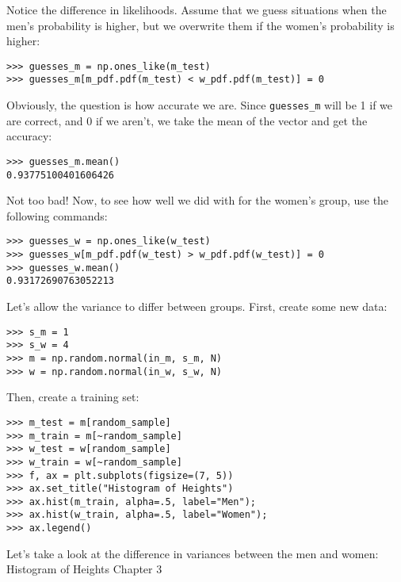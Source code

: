 \documentclass[SKL-MASTER.tex]{subfiles}
\begin{document}
Notice the difference in likelihoods.
Assume that we guess situations when the men's probability is higher, but we overwrite them
if the women's probability is higher:
\begin{framed}
	\begin{verbatim}
>>> guesses_m = np.ones_like(m_test)
>>> guesses_m[m_pdf.pdf(m_test) < w_pdf.pdf(m_test)] = 0
\end{verbatim}
\end{framed}
Obviously, the question is how accurate we are. Since \texttt{guesses\_m} will be 1 if we are correct,
and 0 if we aren't, we take the mean of the vector and get the accuracy:
\begin{framed}
	\begin{verbatim}
>>> guesses_m.mean()
0.93775100401606426
\end{verbatim}
\end{framed}
Not too bad! Now, to see how well we did with for the women's group, use the
following commands:
\begin{framed}
	\begin{verbatim}
>>> guesses_w = np.ones_like(w_test)
>>> guesses_w[m_pdf.pdf(w_test) > w_pdf.pdf(w_test)] = 0
>>> guesses_w.mean()
0.93172690763052213
\end{verbatim}
\end{framed}
Let's allow the variance to differ between groups. First, create some new data:
\begin{framed}
	\begin{verbatim}
>>> s_m = 1
>>> s_w = 4
>>> m = np.random.normal(in_m, s_m, N)
>>> w = np.random.normal(in_w, s_w, N)
\end{verbatim}
\end{framed}
Then, create a training set:
\begin{framed}
\begin{verbatim}
>>> m_test = m[random_sample]
>>> m_train = m[~random_sample]
>>> w_test = w[random_sample]
>>> w_train = w[~random_sample]
>>> f, ax = plt.subplots(figsize=(7, 5))
>>> ax.set_title("Histogram of Heights")
>>> ax.hist(m_train, alpha=.5, label="Men");
>>> ax.hist(w_train, alpha=.5, label="Women");
>>> ax.legend()
\end{verbatim}
\end{framed}
Let's take a look at the difference in variances between the men and women:
Histogram of Heights
Chapter 3
\end{document}
